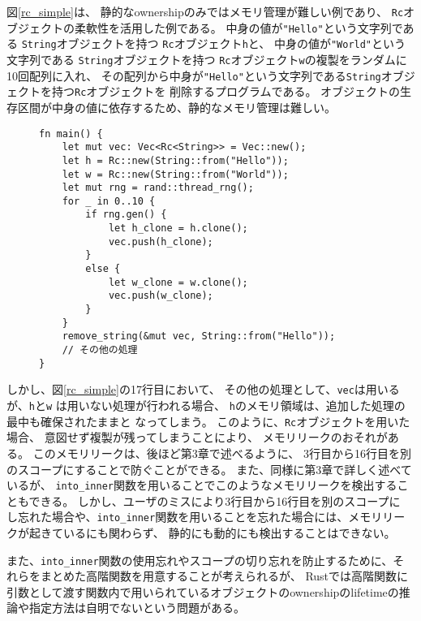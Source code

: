 \documentclass{sumiilab-paper}
\theoremstyle{mystyle}
\numberwithin{definition}{chapter} %
\begin{document}
図\ref{rc_simple}は、
静的なownershipのみではメモリ管理が難しい例であり、
\texttt{Rc}オブジェクトの柔軟性を活用した例である。
中身の値が\texttt{"Hello"}という文字列である
\texttt{String}オブジェクトを持つ
\texttt{Rc}オブジェクト\texttt{h}と、
中身の値が\texttt{"World"}という文字列である
\texttt{String}オブジェクトを持つ
\texttt{Rc}オブジェクト\texttt{w}の複製をランダムに10回配列に入れ、
その配列から中身が\texttt{"Hello"}という文字列である\texttt{String}オブジェクトを持つ\texttt{Rc}オブジェクトを
削除するプログラムである。
オブジェクトの生存区間が中身の値に依存するため、静的なメモリ管理は難しい。
\begin{figure}[htp]
\begin{lstlisting}[caption=静的なメモリ管理では柔軟性に欠ける例, label=rc_simple, captionpos=b]
fn main() {
    let mut vec: Vec<Rc<String>> = Vec::new();
    let h = Rc::new(String::from("Hello"));
    let w = Rc::new(String::from("World"));
    let mut rng = rand::thread_rng();
    for _ in 0..10 {
        if rng.gen() {
            let h_clone = h.clone();
            vec.push(h_clone);
        }
        else {
            let w_clone = w.clone();
            vec.push(w_clone);
        }
    }
    remove_string(&mut vec, String::from("Hello"));
    // その他の処理
}
\end{lstlisting}
\end{figure}

しかし、図\ref{rc_simple}の17行目において、
その他の処理として、\texttt{vec}は用いるが、\texttt{h}と\texttt{w}
は用いない処理が行われる場合、
\texttt{h}のメモリ領域は、追加した処理の最中も確保されたままと
なってしまう。
このように、\texttt{Rc}オブジェクトを用いた場合、
意図せず複製が残ってしまうことにより、
メモリリークのおそれがある。
このメモリリークは、後ほど第3章で述べるように、
3行目から16行目を別のスコープにすることで防ぐことができる。
また、同様に第3章で詳しく述べているが、
\texttt{into\_inner}関数を用いることでこのようなメモリリークを検出することもできる。
しかし、ユーザのミスにより3行目から16行目を別のスコープに
し忘れた場合や、\texttt{into\_inner}関数を用いることを忘れた場合には、メモリリークが起きているにも関わらず、
静的にも動的にも検出することはできない。

また、\texttt{into\_inner}関数の使用忘れやスコープの切り忘れを防止するために、それらをまとめた高階関数を用意することが考えられるが、
Rustでは高階関数に引数として渡す関数内で用いられているオブジェクトのownershipのlifetimeの推論や指定方法は自明でないという問題がある。
\end{document}
